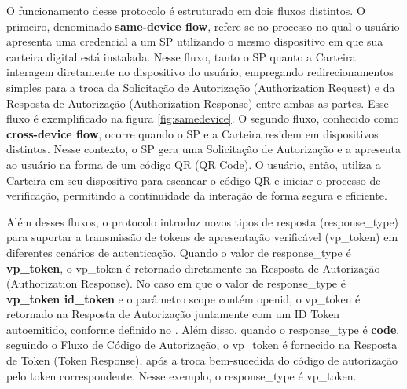 O funcionamento desse protocolo é estruturado em dois fluxos distintos. O primeiro, denominado \textbf{same-device flow}, refere-se ao processo no qual o usuário apresenta uma credencial a um \acs{SP} utilizando o mesmo dispositivo em que sua carteira digital está instalada. Nesse fluxo, tanto o \acs{SP} quanto a Carteira interagem diretamente no dispositivo do usuário, empregando redirecionamentos simples para a troca da Solicitação de Autorização (Authorization Request) e da Resposta de Autorização (Authorization Response) entre ambas as partes. Esse fluxo é exemplificado na figura \autoref{fig:samedevice}. O segundo fluxo, conhecido como \textbf{cross-device flow}, ocorre quando o \acs{SP} e a Carteira residem em dispositivos distintos. Nesse contexto, o \acs{SP} gera uma Solicitação de Autorização e a apresenta ao usuário na forma de um código QR (QR Code). O usuário, então, utiliza a Carteira em seu dispositivo para escanear o código QR e iniciar o processo de verificação, permitindo a continuidade da interação de forma segura e eficiente.

Além desses fluxos, o protocolo introduz novos tipos de resposta (response\_type) para suportar a transmissão de tokens de apresentação verificável (vp\_token) em diferentes cenários de autenticação. Quando o valor de response\_type é \textbf{vp\_token}, o vp\_token é retornado diretamente na Resposta de Autorização (Authorization Response). No caso em que o valor de response\_type é \textbf{vp\_token id\_token} e o parâmetro scope contém openid, o vp\_token é retornado na Resposta de Autorização juntamente com um ID Token autoemitido, conforme definido no \cite{SIOPv2023}. Além disso, quando o response\_type é \textbf{code}, seguindo o Fluxo de Código de Autorização, o vp\_token é fornecido na Resposta de Token (Token Response), após a troca bem-sucedida do código de autorização pelo token correspondente. Nesse exemplo, o response\_type é vp\_token.



